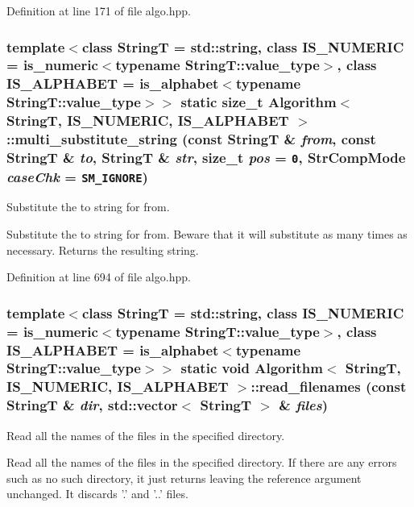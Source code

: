 Definition at line 171 of file algo.hpp.\hypertarget{classAlgorithm_0a6aaf09e6d9d4214b5d6c86938006fb}{
\subsubsection[{multi\_\-substitute\_\-string}]{\setlength{\rightskip}{0pt plus 5cm}template$<$class StringT  = std::string, class IS\_\-NUMERIC  = is\_\-numeric$<$typename StringT::value\_\-type$>$, class IS\_\-ALPHABET  = is\_\-alphabet$<$typename StringT::value\_\-type$>$$>$ static size\_\-t {\bf Algorithm}$<$ StringT, IS\_\-NUMERIC, IS\_\-ALPHABET $>$::multi\_\-substitute\_\-string (const StringT \& {\em from}, \/  const StringT \& {\em to}, \/  StringT \& {\em str}, \/  size\_\-t {\em pos} = {\tt 0}, \/  StrCompMode {\em caseChk} = {\tt SM\_\-IGNORE})}}
\label{classAlgorithm_0a6aaf09e6d9d4214b5d6c86938006fb}


Substitute the to string for from. 

Substitute the to string for from. Beware that it will substitute as many times as necessary. Returns the resulting string. 

Definition at line 694 of file algo.hpp.\hypertarget{classAlgorithm_7f3d9af1b1567546161c773696660c5f}{
\subsubsection[{read\_\-filenames}]{\setlength{\rightskip}{0pt plus 5cm}template$<$class StringT  = std::string, class IS\_\-NUMERIC  = is\_\-numeric$<$typename StringT::value\_\-type$>$, class IS\_\-ALPHABET  = is\_\-alphabet$<$typename StringT::value\_\-type$>$$>$ static void {\bf Algorithm}$<$ StringT, IS\_\-NUMERIC, IS\_\-ALPHABET $>$::read\_\-filenames (const StringT \& {\em dir}, \/  std::vector$<$ StringT $>$ \& {\em files})}}
\label{classAlgorithm_7f3d9af1b1567546161c773696660c5f}


Read all the names of the files in the specified directory. 

Read all the names of the files in the specified directory. If there are any errors such as no such directory, it just returns leaving the reference argument unchanged. It discards '.' and '..' files. 

